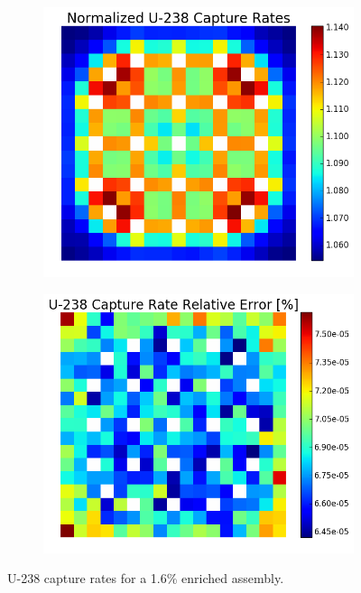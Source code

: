 \begin{figure}[h!]
\centering
\begin{subfigure}{0.5\textwidth}
  \centering
  \includegraphics[width=\linewidth]{figures/benchmarks/capture-rates/capt-mean-fuel-16}
  \caption{}
  \label{fig:chap7-capt-rate-mean-1.6-assm}
\end{subfigure}%
\begin{subfigure}{0.5\textwidth}
  \centering
  \includegraphics[width=\linewidth]{figures/benchmarks/capture-rates/capt-rel-err-fuel-16}
  \caption{}
  \label{fig:chap7-capt-rate-rel-err-1.6-assm}
\end{subfigure}%
\caption[U-238 capture rates for a 1.6\% enriched assembly]{U-238 capture rates for a 1.6\% enriched assembly.}
\label{fig:chap7-capt-rates-1.6-assm}
\end{figure}

